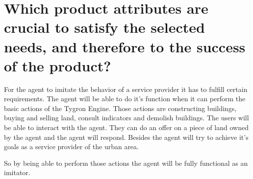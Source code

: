 \section{Which product attributes are crucial to satisfy the selected needs, and therefore to the success of the product?}

For the agent to imitate the behavior of a service provider it has to fulfill certain requirements. The agent will be able to do it's function when it can perform the basic actions of the Tygron Engine. Those actions are constructing buildings, buying and selling land, consult indicators and demolish buildings. The users will be able to interact with the agent. They can do an offer on a piece of land owned by the agent and the agent will respond. Besides the agent will try to achieve it's goals as a service provider of the urban area. \newline

So by being able to perform those actions the agent will be fully functional as an imitator.